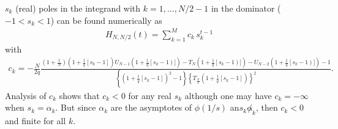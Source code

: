 \documentclass[idelinks, superscriptaddress, amsmath, amssymb, aps, pre]{revtex4-2}
\begin{document}
 $s_{k}$ (real) poles in the integrand with $k=1,...,N/2-1$ in the dominator ($-1<s_k<1$) can be found numerically as
\begin{align}
 H_{N,N/2}(t)=\sum_{k=1}^{M}c_k \,s_k^{t-1}
\label{eq:inv_z_t}
\end{align}
with
\begin{align}
c_k=-\frac{N}{2q}\frac{\left(1+\frac{1}{N}\right)\left(1+\frac{1}{q}\left[s_k-1\right]\right)U_{N-1}\left(1+\frac{1}{q}\left[s_k-1\right)]\right)-T_{N}\left(1+\frac{1}{q}\left[s_k-1\right)]\right)-U_{N-2}\left(1+\frac{1}{q}\left[s_k-1\right)]\right)-1}{\left\{\left(1+\frac{1}{q}\left[s_k-1\right]\right)^2-1\right\}\left\{T_{\frac{N}{2}}\left(1+\frac{1}{q}\left[s_k-1\right]\right)\right\}^2}.
\label{eq:ck}
\end{align}
Analysis of $c_k$ shows that $c_k< 0$ for any real $s_k$ although one may have $c_k=-\infty$ when $s_k=\alpha_k$. But since $\alpha_k$ are the asymptotes of $\phi(1/s)$ an$s_k\not \alpha_k$, then $c_k<0$ and finite for all $k$.


\end{document}
